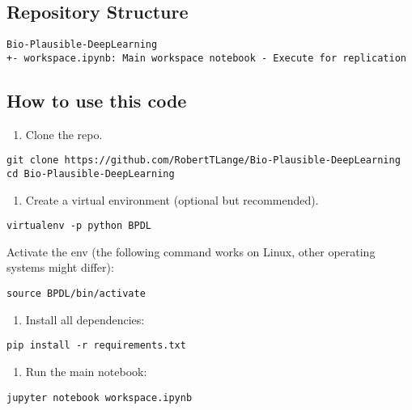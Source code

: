 \hypertarget{repository-structure}{%
\subsection*{Repository Structure}\label{repository-structure}}

\begin{verbatim}
Bio-Plausible-DeepLearning
+- workspace.ipynb: Main workspace notebook - Execute for replication
\end{verbatim}

\hypertarget{how-to-use-this-code}{%
\subsection*{How to use this code}\label{how-to-use-this-code}}

\begin{enumerate}
\def\labelenumi{\arabic{enumi}.}
\tightlist
\item
  Clone the repo.
\end{enumerate}

\begin{verbatim}
git clone https://github.com/RobertTLange/Bio-Plausible-DeepLearning
cd Bio-Plausible-DeepLearning
\end{verbatim}

\begin{enumerate}
\def\labelenumi{\arabic{enumi}.}
\setcounter{enumi}{1}
\tightlist
\item
  Create a virtual environment (optional but recommended).
\end{enumerate}

\begin{verbatim}
virtualenv -p python BPDL
\end{verbatim}

Activate the env (the following command works on Linux, other operating
systems might differ):

\begin{verbatim}
source BPDL/bin/activate
\end{verbatim}

\begin{enumerate}
\def\labelenumi{\arabic{enumi}.}
\setcounter{enumi}{2}
\tightlist
\item
  Install all dependencies:
\end{enumerate}

\begin{verbatim}
pip install -r requirements.txt
\end{verbatim}

\begin{enumerate}
\def\labelenumi{\arabic{enumi}.}
\setcounter{enumi}{3}
\tightlist
\item
  Run the main notebook:
\end{enumerate}

\begin{verbatim}
jupyter notebook workspace.ipynb
\end{verbatim}
